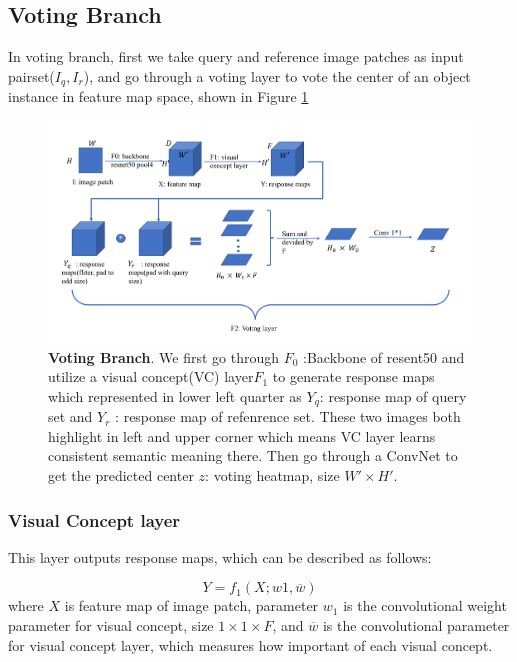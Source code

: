 \documentclass[10pt,twocolumn,letterpaper]{article}
\begin{document}
\subsection{Voting Branch}
In voting branch, first we take query and reference image patches as input pairset($I_q, I_r$), and go through  a voting layer to vote the center of an object instance in feature map space\cite{wang2015unsupervised,zhang2018deepvoting},  shown in Figure \ref{fig:vote}
\begin{figure}
   \includegraphics[width=1\textwidth]{vote.png}
   \caption{\textbf{Voting Branch}. We first go through  $F_0$ :Backbone of resent50 and utilize a visual concept(VC) layer$F_1$ to generate response maps which represented in lower left quarter as $Y_q$: response map of query set and $Y_r$ : response map of refenrence set. These two images  both highlight in left and upper corner which means VC layer learns consistent semantic meaning there.  Then go through a ConvNet to get the predicted center $z$: voting heatmap, size $W' \times H' $. }
   \label{fig:vote}
\end{figure}


\subsubsection{Visual Concept layer}
This layer outputs response maps, which can be described as follows:

   \begin{equation}
      Y = f_1(X;w1,\overline{w})
   \end{equation}
   where $X$ is feature map of image patch, parameter $w_1$ is the convolutional weight parameter for visual concept, size $1 \times 1\times F $, and $\overline{w}$ is the convolutional parameter for visual concept layer, which measures how important of each visual concept.
\end{document}

